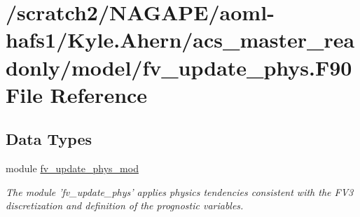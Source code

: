 \section{/scratch2/\-N\-A\-G\-A\-P\-E/aoml-\/hafs1/\-Kyle.Ahern/acs\-\_\-master\-\_\-readonly/model/fv\-\_\-update\-\_\-phys.F90 File Reference}
\label{fv__update__phys_8F90}
\subsection*{Data Types}
\begin{DoxyCompactItemize}
\item 
module \hyperlink{classfv__update__phys__mod}{fv\-\_\-update\-\_\-phys\-\_\-mod}
\begin{DoxyCompactList}\small\item\em The module 'fv\-\_\-update\-\_\-phys' applies physics tendencies consistent with the F\-V3 discretization and definition of the prognostic variables. \end{DoxyCompactList}\end{DoxyCompactItemize}
